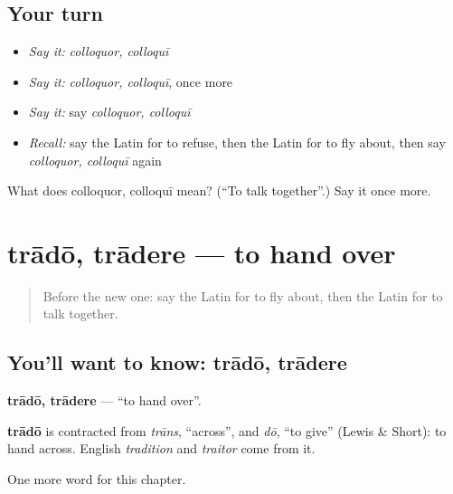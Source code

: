 \subsection*{Your turn}
\begin{itemize}
\raggedright
  \item \emph{Say it:} \emph{colloquor, colloquī}
  \item \emph{Say it:} \emph{colloquor, colloquī}, once more
  \item \emph{Say it:} say \emph{colloquor, colloquī}
  \item \emph{Recall:} say the Latin for to refuse, then the Latin for to fly about, then say \emph{colloquor, colloquī} again
\end{itemize}

\begin{tcolorbox}[breakable,colback=teal!4,colframe=teal!35!black,title={Before you move on}]
What does colloquor, colloquī mean? (\textquotedblleft{}To talk together\textquotedblright{}.) Say it once more.
\end{tcolorbox}
\section[trādō, trādere]{trādō, trādere — to hand over}

\label{lesson:LA-C201-trado}



\begin{quote}
Before the new one: say the Latin for to fly about, then the Latin for to talk together.
\end{quote}

\subsection*{You'll want to know: trādō, trādere}
\textbf{trādō, trādere} — \textquotedblleft{}to hand over\textquotedblright{}.

\begin{cousinweb}
\textbf{trādō} is contracted from \emph{trāns}, \textquotedblleft{}across\textquotedblright{}, and \emph{dō}, \textquotedblleft{}to give\textquotedblright{} (Lewis \& Short): to hand across. English \emph{tradition} and \emph{traitor} come from it.
\end{cousinweb}

\begin{grammarlens}[title={What you've built}]
One more word for this chapter.
\end{grammarlens}


